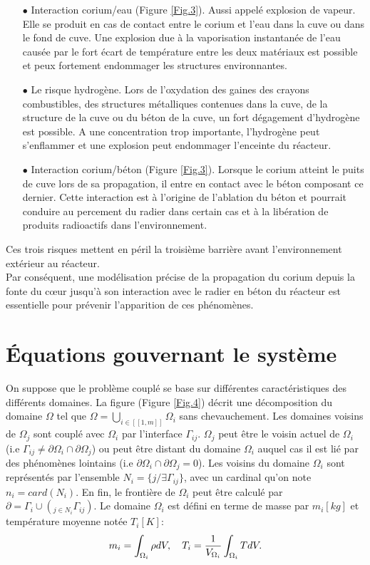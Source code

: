 \documentclass[11pt,a4paper]{scrartcl}%
\begin{document}
	\begin{itemize}
		\item [$\bullet$] Interaction corium/eau (Figure \ref{Fig.3}). Aussi appelé explosion de vapeur. Elle se produit en cas de contact entre le corium et l'eau dans la cuve ou dans le fond de cuve. Une explosion due à la vaporisation instantanée de l'eau causée par le fort écart de température entre les deux matériaux est possible et peux fortement endommager les structures environnantes.
		\item [$\bullet$] Le risque hydrogène. Lors de l'oxydation des gaines des crayons combustibles, des structures métalliques contenues dans la cuve, de la structure de la cuve ou du béton de la cuve, un fort dégagement d'hydrogène est possible. A une concentration trop importante, l'hydrogène peut s'enflammer et une explosion peut endommager l'enceinte du réacteur.
		\item[$\bullet$] Interaction corium/béton (Figure \ref{Fig.3}). Lorsque le corium atteint le puits de cuve lors de sa propagation, il entre en contact avec le béton composant ce dernier. Cette interaction est à l'origine de l'ablation du béton et pourrait conduire au percement du radier dans certain cas et à la libération de produits radioactifs dans l'environnement. 
	\end{itemize} 
	Ces trois risques mettent en péril la troisième barrière avant l'environnement extérieur au réacteur.\\
	
	Par conséquent, une modélisation précise de la propagation du corium depuis la fonte du cœur jusqu'à son interaction avec le radier en béton du réacteur est essentielle pour prévenir l'apparition de ces phénomènes.\\
	\newpage
	\section{Équations gouvernant le système}\label{sec2}
	On suppose que le problème couplé se base sur différentes caractéristiques des différents domaines. La figure (Figure \ref{Fig.4}) décrit une décomposition du domaine $\Omega$ tel que $\Omega = \bigcup_{i \in [[1,m]]}\Omega_i$ sans chevauchement. Les domaines voisins de $\Omega_j$ sont couplé avec $\Omega_i$ par l'interface $\Gamma_{ij}$. $\Omega_j$ peut être le voisin actuel de $\Omega_i$ (i.e $\Gamma_{ij} \neq \partial\Omega_i\cap\partial\Omega_j$) ou peut être distant du domaine $\Omega_i$ auquel cas il est lié par des phénomènes lointains (i.e $\partial\Omega_i\cap\partial\Omega_j = 0$). Les voisins du domaine $\Omega_i$ sont représentés par l'ensemble $N_i = \{j/\exists \Gamma_{ij}\}$, avec un cardinal qu'on note $n_i = card(N_i)$. En fin, le frontière de $\Omega_i$ peut être calculé par $\partial = \Gamma_i\cup(_{j\in N_i}\Gamma_{ij})$. Le domaine $\Omega_i$ est défini en terme de masse par $m_i[kg]$ et température moyenne notée $T_i[K]$:
	\begin{equation}
	m_i = \int_{\Omega_i}\rho dV, \quad T_i = \frac{1}{V_{\Omega_i}}\int_{\Omega_i}T dV.\notag
	\end{equation} 
	
\end{document}
